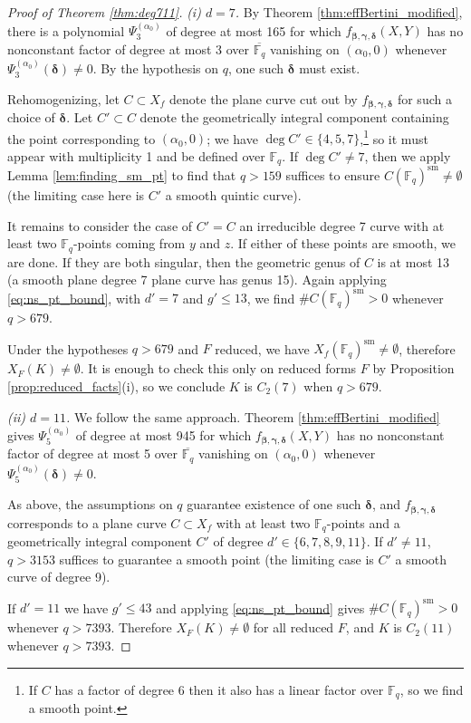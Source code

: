 \documentclass{amsart}
\newcommand{\F}{\mathbb{F}}
\newcommand{\sm}{\mathrm{sm}}
\renewcommand{\v}{\beta}
\newcommand{\w}{\gamma}
\newcommand{\z}{\delta}
\newcommand{\bv}{\boldsymbol{\v}}
\newcommand{\bw}{\boldsymbol{\w}}
\newcommand{\bz}{\boldsymbol{\z}}
\theoremstyle{definition}
\numberwithin{equation}{section}
\numberwithin{table}{section}
\newcommand{\qbound}[1]{{\color{cyan}$q > {#1}$}}
\renewcommand{\qbound}[1]{{$q > {#1}$}}
\begin{document}
\begin{proof}[Proof of Theorem \ref{thm:deg711}]
    \bigskip
    \noindent\textit{(i) $d=7$.} By Theorem \ref{thm:effBertini_modified}, there is a polynomial $\Psi_3^{(\alpha_0)}$ of degree at most 165 for which $f_{\bv,\bw,\bz}(X,Y)$ has no nonconstant factor of degree at most 3 over $\overline{\F_q}$ vanishing on $(\alpha_0,0)$ whenever $\Psi_3^{(\alpha_0)}(\bz) \neq 0$. By the hypothesis on $q$, one such $\bz$ must exist.
    
    Rehomogenizing, let $C \subset X_f$ denote the plane curve cut out by $f_{\bv,\bw,\bz}$ for such a choice of $\bz$. Let $C' \subset C$ denote the geometrically integral component containing the point corresponding to $(\alpha_0,0)$; we have $\deg C' \in \{4,5,7\}$,\footnote{If $C$ has a factor of degree 6 then it also has a linear factor over $\F_q$, so we find a smooth point.} so it must appear with multiplicity 1 and be defined over $\F_q$. If $\deg C' \neq 7$, then we apply Lemma \ref{lem:finding_sm_pt} to find that \qbound{159} suffices to ensure $C(\F_q)^\sm \neq \emptyset$ (the limiting case here is $C'$ a smooth quintic curve).    
    
	It remains to consider the case of $C' = C$ an irreducible degree 7 curve with at least two $\F_q$-points coming from $y$ and $z$. If either of these points are smooth, we are done. If they are both singular, then the geometric genus of $C$ is at most 13 (a smooth plane degree 7 plane curve has genus 15). Again applying \eqref{eq:ns_pt_bound}, with $d'=7$ and $g' \leq 13$, we find $\#C(\F_q)^{\sm} > 0$ whenever \qbound{679}.
    
    Under the hypotheses \qbound{679} and $F$ reduced, we have $X_f(\F_q)^{\sm} \neq \emptyset$, therefore $X_F(K) \neq \emptyset$. It is enough to check this only on reduced forms $F$ by Proposition \ref{prop:reduced_facts}(i), so we conclude $K$ is $C_2(7)$ when \qbound{679}.
        
    \bigskip
    \noindent\textit{(ii) $d=11$.} We follow the same approach. Theorem \ref{thm:effBertini_modified} gives $\Psi_{5}^{(\alpha_0)}$ of degree at most 945 for which $f_{\bv,\bw,\bz}(X,Y)$ has no nonconstant factor of degree at most 5 over $\overline{\F_q}$ vanishing on $(\alpha_0,0)$ whenever $\Psi_5^{(\alpha_0)}(\bz) \neq 0$. 
    
    As above, the assumptions on $q$ guarantee existence of one such $\bz$, and $f_{\bv,\bw,\bz}$ corresponds to a plane curve $C \subset X_f$ with at least two $\F_q$-points and a geometrically integral component $C'$ of degree $d' \in \{6,7, 8, 9, 11\}$. If $d' \neq 11$, \qbound{3153} suffices to guarantee a smooth point (the limiting case is $C'$ a smooth curve of degree 9).
    
    If $d'=11$ we have $g' \leq 43$ and applying \eqref{eq:ns_pt_bound} gives $\#C(\F_q)^\sm > 0$ whenever \qbound{7393}. Therefore $X_F(K) \neq \emptyset$ for all reduced $F$, and $K$ is $C_2(11)$ whenever \qbound{7393}.
\end{proof}



\end{document}
